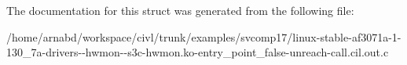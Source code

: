 The documentation for this struct was generated from the following file\+:\begin{DoxyCompactItemize}
\item 
/home/arnabd/workspace/civl/trunk/examples/svcomp17/linux-\/stable-\/af3071a-\/1-\/130\+\_\+7a-\/drivers-\/-\/hwmon-\/-\/s3c-\/hwmon.\+ko-\/entry\+\_\+point\+\_\+false-\/unreach-\/call.\+cil.\+out.\+c\end{DoxyCompactItemize}
